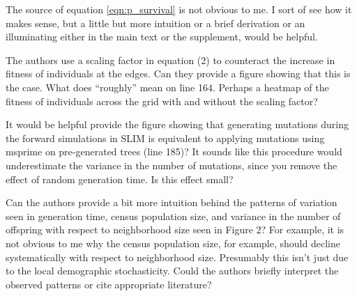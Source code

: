 \begin{point}{}
    The source of equation \eqref{eqn:p_survival} is not obvious to me. I sort of see how it makes sense, but a little but more intuition or a brief derivation or an illuminating either in the main text or the supplement, would be helpful.
\end{point}


\begin{point}{}
    The authors use a scaling factor in equation (2) to counteract the increase in fitness of individuals at the edges. Can they provide a figure showing that this is the case. What does ``roughly'' mean on line 164. Perhaps a heatmap of the fitness of individuals across the grid with and without the scaling factor?
\end{point}


\begin{point}{}
    It would be helpful provide the figure showing that generating mutations during the forward simulations in SLIM is equivalent to applying mutations using msprime on pre-generated trees (line 185)? It sounds like this procedure would underestimate the variance in the number of mutations, since you remove the effect of random generation time. Is this effect small?
\end{point}


\begin{point}{}
    Can the authors provide a bit more intuition behind the patterns of variation seen in generation time, census population size, and variance in the number of offspring with respect to neighborhood size seen in Figure 2? For example, it is not obvious to me why the census population size, for example, should decline systematically with respect to neighborhood size. Presumably this isn't just due to the local demographic stochasticity. Could the authors briefly interpret the observed patterns or cite appropriate literature?
\end{point}

